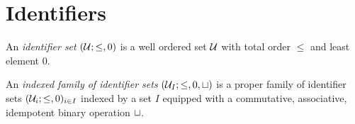 \section{Identifiers}
\label{sec:identifiers}

\begin{definition}
  An \emph{identifier set} $(\mathcal{U}; \leq, 0)$
  is a well ordered set $\mathcal{U}$ with total order $\leq$ and least element $0$.
\end{definition}

\begin{definition}
  An \emph{indexed family of identifier sets} $(\mathcal{U}_{I}; \leq, 0, \operatorname{\sqcup})$
  is a proper family of identifier sets $(\mathcal{U}_i; \leq, 0)_{i \in I}$
  indexed by a set $I$ equipped with a commutative, associative, idempotent binary operation $\operatorname{\sqcup}$.
\end{definition}
